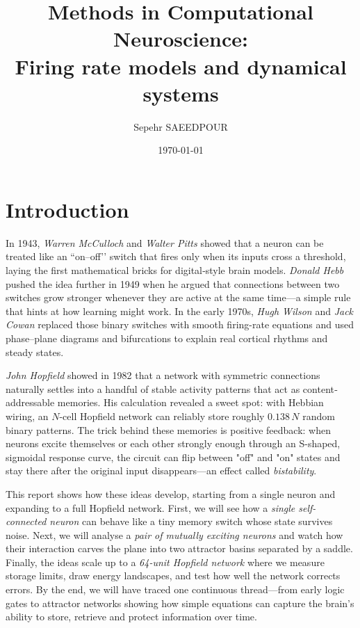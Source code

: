 \documentclass{article}
\title{Methods in Computational Neuroscience:\\Firing rate models and dynamical systems}
\author{Sepehr SAEEDPOUR}
\date{\today}
\begin{document}
\maketitle

\section*{Introduction}
In 1943, \emph{Warren McCulloch} and \emph{Walter Pitts} showed that a neuron can be treated like an “on–off’’ switch that fires only when its inputs cross a threshold, laying the first mathematical bricks for digital‐style brain models.
\emph{Donald Hebb} pushed the idea further in 1949 when he argued that connections between two switches grow stronger whenever they are active at the same time—a simple rule that hints at how learning might work.
In the early 1970s, \emph{Hugh Wilson} and \emph{Jack Cowan} replaced those binary switches with smooth firing-rate equations and used phase–plane diagrams and bifurcations to explain real cortical rhythms and steady states.

\emph{John Hopfield} showed in 1982 that a network with symmetric connections naturally settles into a handful of stable activity patterns that act as content‐addressable memories.  
His calculation revealed a sweet spot: with Hebbian wiring, an $N$-cell Hopfield network can reliably store roughly $0.138\,N$ random binary patterns.  
The trick behind these memories is positive feedback: when neurons excite themselves or each other strongly enough through an S-shaped, sigmoidal response curve, the circuit can flip between "off" and "on" states and stay there after the original input disappears—an effect called \emph{bistability}. 

This report shows how these ideas develop, starting from a single neuron and expanding to a full Hopfield network.
First, we will see how a \emph{single self-connected neuron} can behave like a tiny memory switch whose state survives noise.  
Next, we will analyse a \emph{pair of mutually exciting neurons} and watch how their interaction carves the plane into two attractor basins separated by a saddle.  
Finally, the ideas scale up to a \emph{64-unit Hopfield network} where we measure storage limits, draw energy landscapes, and test how well the network corrects errors.  
By the end, we will have traced one continuous thread—from early logic gates to attractor networks showing how simple equations can capture the brain’s ability to store, retrieve and protect information over time.
\end{document}
